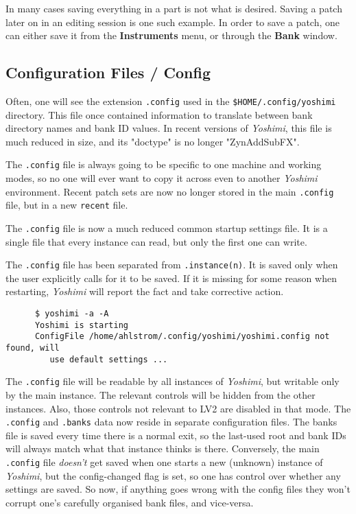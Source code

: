    In many cases saving everything in a part is not what is desired.
   Saving a patch later on in an editing session is one such example.
   In order to save a patch, one can either save it from the
   \textbf{Instruments} menu, or through the \textbf{Bank} window.

\subsection{Configuration Files / Config}
\label{subsec:configuration_config}

   Often, one will see the extension \texttt{.config} used in the
   \texttt{\$HOME/.config/yoshimi} directory.  This file once contained
   information to translate between bank directory names and bank ID
   values.  In recent versions of \textsl{Yoshimi}, this file is much
   reduced in size, and its "doctype" is no longer "ZynAddSubFX".

   The \texttt{.config} file is always going to be specific to one machine and
   working modes, so no one will ever want to copy it across even to another
   \textsl{Yoshimi} environment.  Recent patch sets are now no longer stored in
   the main \texttt{.config} file, but in a new \texttt{recent} file.


   The \texttt{.config} file is now a much reduced common startup settings
   file.  It is a single file that every instance can read, but only the
   first one can write.

   The \texttt{.config} file has been separated from \texttt{.instance(n)}.
   It is saved only when the user explicitly calls for it to be saved. If
   it is missing for some reason when restarting, \textsl{Yoshimi} will
   report the fact and take corrective action.

   \begin{verbatim}
      $ yoshimi -a -A
      Yoshimi is starting
      ConfigFile /home/ahlstrom/.config/yoshimi/yoshimi.config not found, will
         use default settings ...
   \end{verbatim}

   The \texttt{.config} file will be readable by all instances of
   \textsl{Yoshimi}, but writable only by the main instance. The relevant
   controls will be hidden from the other instances.  Also, those controls not
   relevant to LV2 are disabled in that mode.  The \texttt{.config} and
   \texttt{.banks} data now reside in separate configuration files.  The banks
   file is saved every time there is a normal exit, so the last-used root and
   bank IDs will always match what that instance thinks is there.  Conversely,
   the main \texttt{.config} file \textsl{doesn't} get saved when one starts a
   new (unknown) instance of \textsl{Yoshimi}, but the config-changed flag is
   set, so one has control over whether any settings are saved.  So now, if
   anything goes wrong with the config files they won't corrupt one's carefully
   organised bank files, and vice-versa.

